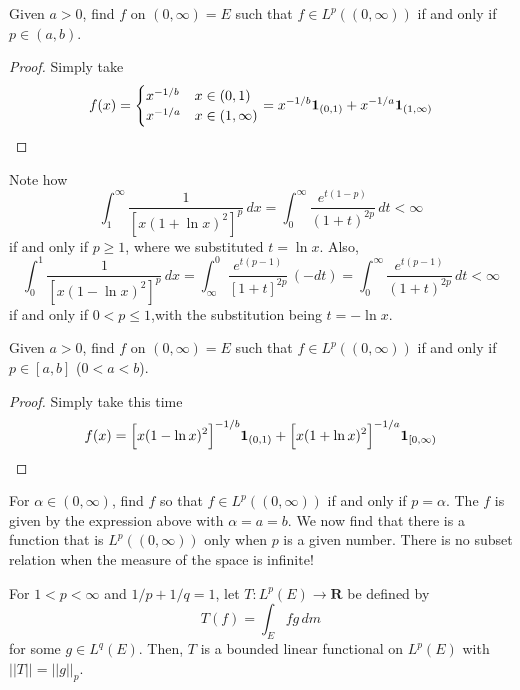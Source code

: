 \vspace{2ex}
\begin{ex}
Given $a>0$, find $f$ on $(0,\infty )=E$ such that $f\in L^{p}((0,\infty ))$ if and only if $p\in (a,b)$. 
\end{ex}
\vspace{2ex}
\begin{proof}
Simply take
\[f(x)=\begin{cases}
x^{-1/b}&x\in (0,1)\\
x^{-1/a}&x\in (1,\infty )
\end{cases}=x^{-1/b}{\bf 1}_{(0,1)}+x^{-1/a}{\bf 1}_{(1,\infty )}\]
\end{proof}
\vspace{2ex}
\begin{ex}
Note how
\[\int ^{\infty }_{1}\dfrac{1}{[x(1+\ln x)^2]^{p}}\,d x=\int ^{\infty }_{0}\dfrac{e^{t(1-p)}}{(1+t)^{2p}}\,d t<\infty \]
if and only if $p\geq 1$, where we substituted $t=\ln x$. Also,
\[\int ^{1}_{0}\dfrac{1}{[x(1-\ln x)^2]^{p}}\,dx =\int ^{0}_{\infty }\dfrac{e^{t(p-1)}}{[1+t]^{2p}}\,(-dt)=\int ^{\infty }_{0}\dfrac{e^{t(p-1)}}{(1+t)^{2p}}\,d t<\infty \]
if and only if $0<p\leq 1 $,with the substitution being $t=-\ln x$. 
\end{ex}
\vspace{2ex}
\begin{ex}
Given $a>0$, find $f$ on $(0,\infty )=E$ such that $f\in L^{p}((0,\infty ))$ if and only if $p\in [a,b]$ ($0<a<b$). 
\end{ex}
\vspace{2ex}
\begin{proof}
Simply take this time
\[f(x)=\Big[x(1-\ln x)^2\Big]^{-1/b}{\bf 1}_{(0,1)}+\Big[x(1+\ln x)^2\Big]^{-1/a}{\bf 1}_{[0,\infty )}\]
\end{proof}
\vspace{2ex}
\begin{ex}
For $\alpha \in (0,\infty )$, find $f$ so that $f\in L^{p}((0,\infty ))$ if and only if $p=\alpha $. The $f$ is given by the expression above with $\alpha =a=b$. We now find that there is a function that is $L^{p}((0,\infty ))$ only when $p$ is a given number. There is no subset relation when the measure of the space is infinite!
\end{ex}
\vspace{2ex}
\begin{thm}
For $1<p<\infty $ and $1/p+1/q=1$, let $T:L^{p}(E)\rightarrow {\bm R}$ be defined by
\[T(f)=\int _{E}fg\,d m\]
for some $g\in L^{q}(E)$. Then, $T$ is a bounded linear functional on $L^{p}(E)$ with $||T||=||g||_{p}$. 
\end{thm}
